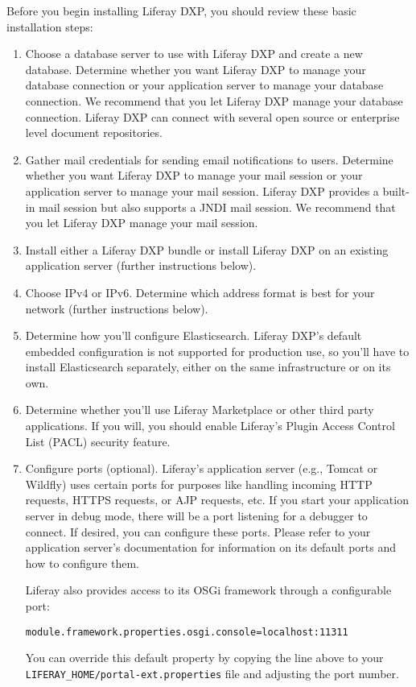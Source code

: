 Before you begin installing Liferay DXP, you should review these basic
installation steps:

\begin{enumerate}
\def\labelenumi{\arabic{enumi}.}
\item
  Choose a database server to use with Liferay DXP and create a new
  database. Determine whether you want Liferay DXP to manage your
  database connection or your application server to manage your database
  connection. We recommend that you let Liferay DXP manage your database
  connection. Liferay DXP can connect with several open source or
  enterprise level document repositories.
\item
  Gather mail credentials for sending email notifications to users.
  Determine whether you want Liferay DXP to manage your mail session or
  your application server to manage your mail session. Liferay DXP
  provides a built-in mail session but also supports a JNDI mail
  session. We recommend that you let Liferay DXP manage your mail
  session.
\item
  Install either a Liferay DXP bundle or install Liferay DXP on an
  existing application server (further instructions below).
\item
  Choose IPv4 or IPv6. Determine which address format is best for your
  network (further instructions below).
\item
  Determine how you'll configure Elasticsearch. Liferay DXP's default
  embedded configuration is not supported for production use, so you'll
  have to install Elasticsearch separately, either on the same
  infrastructure or on its own.
\item
  Determine whether you'll use Liferay Marketplace or other third party
  applications. If you will, you should enable Liferay's Plugin Access
  Control List (PACL) security feature.
\item
  Configure ports (optional). Liferay's application server (e.g., Tomcat
  or Wildfly) uses certain ports for purposes like handling incoming
  HTTP requests, HTTPS requests, or AJP requests, etc. If you start your
  application server in debug mode, there will be a port listening for a
  debugger to connect. If desired, you can configure these ports. Please
  refer to your application server's documentation for information on
  its default ports and how to configure them.

  Liferay also provides access to its OSGi framework through a
  configurable port:

  \texttt{module.framework.properties.osgi.console=localhost:11311}

  You can override this default property by copying the line above to
  your \texttt{LIFERAY\_HOME/portal-ext.properties} file and adjusting
  the port number.
\end{enumerate}

